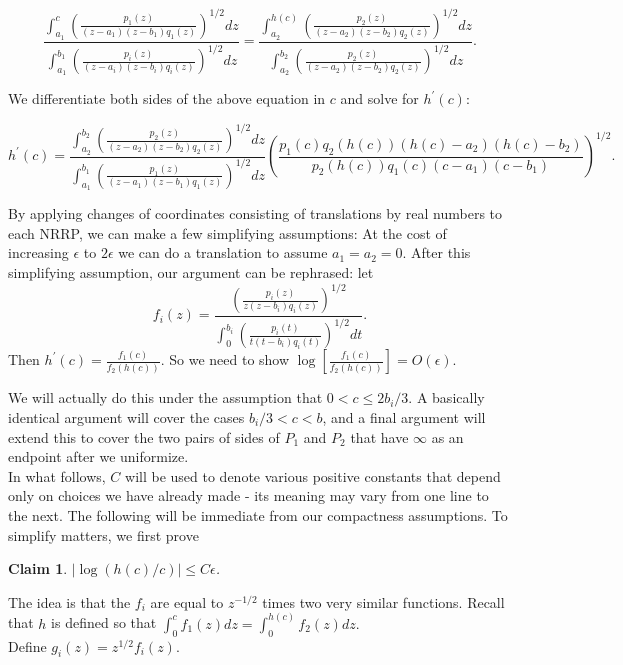 \documentclass[12pt]{article}
\newtheorem{claim}[theorem]{Claim}
\begin{document}
$$\frac{\int_{a_1}^c \left(\frac{p_1(z)}{(z - a_1)(z - b_1)q_1(z)}\right)^{1/2}dz}{\int_{a_1}^{b_1} \left(\frac{p_i(z)}{(z - a_i)(z - b_i)q_i(z)}\right)^{1/2}dz} = \frac{\int_{a_2}^{h(c)} \left(\frac{p_2(z)}{(z - a_2)(z - b_2)q_2(z)}\right)^{1/2}dz}{\int_{a_2}^{b_2} \left(\frac{p_2(z)}{(z - a_2)(z - b_2)q_2(z)}\right)^{1/2}dz}.$$

\noindent We differentiate both sides of the above equation in $c$ and solve for $h^\prime(c)$:

$$h^\prime(c) = \frac{\int_{a_2}^{b_2} \left(\frac{p_2(z)}{(z - a_2)(z - b_2)q_2(z)}\right)^{1/2}dz}{\int_{a_1}^{b_1} \left(\frac{p_1(z)}{(z - a_1)(z - b_1)q_1(z)}\right)^{1/2}dz}\left(\frac{p_1(c)q_2(h(c))(h(c) - a_2)(h(c) - b_2)}{p_2(h(c))q_1(c)(c - a_1)(c - b_1)}\right)^{1/2}.$$

\noindent By applying changes of coordinates consisting of translations by real numbers to each NRRP, we can make a few simplifying assumptions: At the cost of increasing $\epsilon$ to $2\epsilon$ we can do a translation to assume $a_1 = a_2 = 0$. After this simplifying assumption, our argument can be rephrased: let $$f_i(z) = \frac{\left(\frac{p_i(z)}{z(z - b_i)q_i(z)}\right)^{1/2}}{\int_{0}^{b_i} \left(\frac{p_i(t)}{t(t - b_i)q_i(t)}\right)^{1/2}dt}.$$ Then $h^\prime(c) = \frac{f_1(c)}{f_2(h(c))}.$ So we need to show $\log \left[\frac{f_1(c)}{f_2(h(c))}\right] = O(\epsilon).$

\noindent We will actually do this under the assumption that $0 < c \leq 2b_i/3.$ A basically identical argument will cover the cases $b_i/3 < c < b$, and a final argument will extend this to cover the two pairs of sides of $P_1$ and $P_2$ that have $\infty$ as an endpoint after we uniformize.\\

\noindent In what follows, $C$ will be used to denote various positive constants that depend only on choices we have already made - its meaning may vary from one line to the next. The following will be immediate from our compactness assumptions. To simplify matters, we first prove 

\begin{claim} $|\log(h(c)/c)| \leq C\epsilon$.\end{claim}

\noindent The idea is that the $f_i$ are equal to $z^{-1/2}$ times two very similar functions. Recall that $h$ is defined so that $\int_0^c f_1(z)dz = \int_0^{h(c)}f_2(z)dz.$\\

\noindent Define $g_i(z) = z^{1/2}f_i(z).$\\
\end{document}
